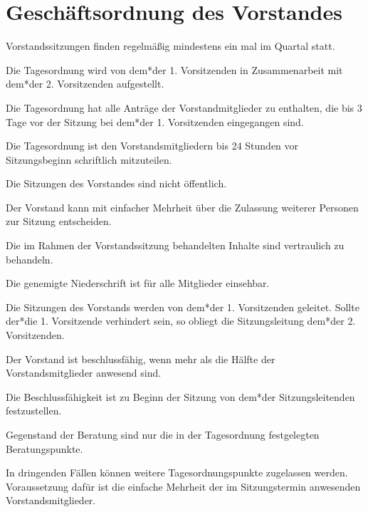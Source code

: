 \section{Geschäftsordnung des Vorstandes}

\begin{gfvorstand}

  Vorstandssitzungen finden regelmäßig mindestens ein mal im Quartal statt.

  Die Tagesordnung wird von dem*der 1. Vorsitzenden in Zusammenarbeit mit dem*der 2. Vorsitzenden aufgestellt.

  Die Tagesordnung hat alle Anträge der Vorstandmitglieder zu enthalten, die bis 3 Tage vor der Sitzung bei dem*der 1. Vorsitzenden eingegangen sind.

  Die Tagesordnung ist den Vorstandsmitgliedern bis 24 Stunden vor Sitzungsbeginn schriftlich mitzuteilen.

  Die Sitzungen des Vorstandes sind nicht öffentlich.

  Der Vorstand kann mit einfacher Mehrheit über die Zulassung weiterer Personen zur Sitzung entscheiden.

  Die im Rahmen der Vorstandssitzung behandelten Inhalte sind vertraulich zu behandeln.

  Die genemigte Niederschrift ist für alle Mitglieder einsehbar.

  Die Sitzungen des Vorstands werden von dem*der 1. Vorsitzenden geleitet. Sollte der*die 1. Vorsitzende verhindert sein, so obliegt die Sitzungsleitung dem*der 2. Vorsitzenden.


  Der Vorstand ist beschlussfähig, wenn mehr als die Hälfte der Vorstandsmitglieder anwesend sind.

  Die Beschlussfähigkeit ist zu Beginn der Sitzung von dem*der Sitzungsleitenden festzustellen.


  Gegenstand der Beratung sind nur die in der Tagesordnung festgelegten Beratungspunkte.

  In dringenden Fällen können weitere Tagesordnungspunkte zugelassen werden. Voraussetzung dafür ist die einfache Mehrheit der im Sitzungstermin anwesenden Vorstandsmitglieder.



\end{gfvorstand}
